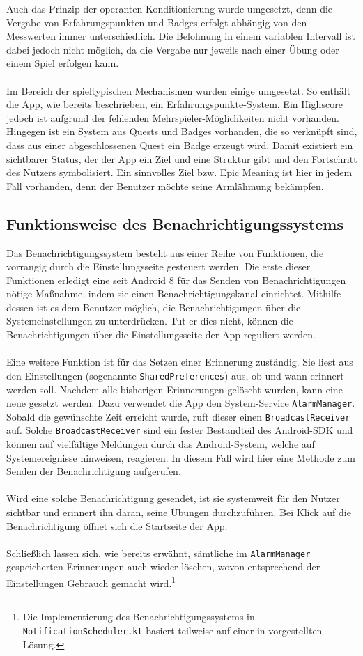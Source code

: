 Auch das Prinzip der operanten Konditionierung wurde umgesetzt, denn die Vergabe von Erfahrungspunkten und Badges erfolgt abhängig von den Messwerten immer unterschiedlich. Die Belohnung in einem variablen Intervall ist dabei jedoch nicht möglich, da die Vergabe nur jeweils nach einer Übung oder einem Spiel erfolgen kann. \\ \\
Im Bereich der spieltypischen Mechanismen wurden einige umgesetzt. So enthält die App, wie bereits beschrieben, ein Erfahrungspunkte-System. Ein Highscore jedoch ist aufgrund der fehlenden Mehrspieler-Möglichkeiten nicht vorhanden. Hingegen ist ein System aus Quests und Badges vorhanden, die so verknüpft sind, dass aus einer abgeschlossenen Quest ein Badge erzeugt wird. Damit existiert ein sichtbarer Status, der der App ein Ziel und eine Struktur gibt und den Fortschritt des Nutzers symbolisiert. Ein sinnvolles Ziel bzw. Epic Meaning ist hier in jedem Fall vorhanden, denn der Benutzer möchte seine Armlähmung bekämpfen.
\subsection{Funktionsweise des Benachrichtigungssystems}
Das Benachrichtigungssystem besteht aus einer Reihe von Funktionen, die vorrangig durch die Einstellungsseite gesteuert werden. Die erste dieser Funktionen erledigt eine seit Android 8 für das Senden von Benachrichtigungen nötige Maßnahme, indem sie einen Benachrichtigungskanal einrichtet. Mithilfe dessen ist es dem Benutzer möglich, die Benachrichtigungen über die Systemeinstellungen zu unterdrücken.\cite{Src:AndroidNotify} Tut er dies nicht, können die Benachrichtigungen über die Einstellungsseite der App reguliert werden.\\ \\
Eine weitere Funktion ist für das Setzen einer Erinnerung zuständig. Sie liest aus den Einstellungen (sogenannte \texttt{SharedPreferences}) aus, ob und wann erinnert werden soll. Nachdem alle bisherigen Erinnerungen gelöscht wurden, kann eine neue gesetzt werden. Dazu verwendet die App den System-Service \texttt{AlarmManager}\cite{Src:NotifyDroid}. Sobald die gewünschte Zeit erreicht wurde, ruft dieser einen \texttt{BroadcastReceiver} auf. Solche \texttt{BroadcastReceiver} sind ein fester Bestandteil des Android-SDK und können auf vielfältige Meldungen durch das Android-System, welche auf Systemereignisse hinweisen, reagieren.\cite{Src:AndroidKuenneth} In diesem Fall wird hier eine Methode zum Senden der Benachrichtigung aufgerufen. \\ \\
Wird eine solche Benachrichtigung gesendet, ist sie systemweit für den Nutzer sichtbar und erinnert ihn daran, seine Übungen durchzuführen. Bei Klick auf die Benachrichtigung öffnet sich die Startseite der App. \\ \\
Schließlich lassen sich, wie bereits erwähnt, sämtliche im \texttt{AlarmManager} gespeicherten Erinnerungen auch wieder löschen, wovon entsprechend der Einstellungen Gebrauch gemacht wird.\footnote[3]{Die Implementierung des Benachrichtigungssystems in \texttt{NotificationScheduler.kt} basiert teilweise auf einer in  \cite{Src:NotifyDroid} vorgestellten Lösung.}